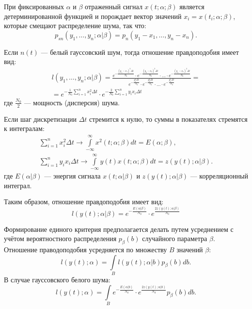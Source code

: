 \documentclass[a4paper,12pt]{article}
\begin{document}
    При фиксированных $\alpha$ и $\beta$ отраженный сигнал $x(t; \alpha; \beta)$ является детерминированной функцией и порождает вектор значений
    $x_i = x(t_i; \alpha; \beta)$, которые смещают распределение шума, так что:
    \[
        p_{sn}(y_1, \dots, y_n; \alpha | \beta) = p_n ( y_1 - x_1, \dots, y_n - x_n ) .
    \]

    Если $n(t)$ --- белый гауссовский шум, тогда отношение правдоподобия имеет вид:
    \begin{multline*}
        l(y_1, \dots, y_n; \alpha | \beta)
        = \frac
        {
            e^{-\frac{(y_1 - x_1)^2 \Delta t}{N_0}} \cdot e^{-\frac{(y_2 - x_2)^2 \Delta t}{N_0}} \cdot ... \cdot e^{-\frac{(y_n - x_n)^2 \Delta t}{N_0}}
        }
        {
            e^{-\frac{y_1^2 \Delta t}{N_0}} \cdot e^{-\frac{y_2^2 \Delta t}{N_0}} \cdot ... \cdot e^{-\frac{y_n^2 \Delta t}{N_0}}
        }
        = \\
        = e^{-\frac{1}{N_0} \sum_{i=1}^n x_i^2 \Delta t} \cdot e^{-\frac{2}{N_0} \sum_{i=1}^n y_i x_i \Delta t}
    \end{multline*}
    где $\frac{N_0}{2}$ --- мощность (дисперсия) шума.

    Если шаг дискретизации $\Delta t$ стремится к нулю, то суммы в показателях стремятся к интегралам:
    \begin{gather*}
        \sum_{i=1}^n x_i^2 \Delta t \rightarrow \int \limits_{-\infty}^{\infty} x^2(t; \alpha; \beta) dt = E(\alpha; \beta) , \\
        \sum_{i=1}^n y_i x_i \Delta t \rightarrow \int \limits_{-\infty}^{\infty} y(t) x(t; \alpha; \beta) dt = z(y(t); \alpha | \beta) .
    \end{gather*}
    где $E(\alpha | \beta)$ --- энергия сигнала $x(t; \alpha | \beta)$ и $z(y(t); \alpha | \beta)$ --- корреляционный интеграл.

    Таким образом, отношение правдоподобия имеет вид:
    \[
        l(y(t); \alpha | \beta) = e^{-\frac{E(\alpha | \beta)}{N_0}} \cdot e^{\frac{2 z(y(t); \alpha | \beta)}{N_0}}
    \]

    Формирование единого критерия предполагается делать путем усреднением с учётом вероятностного распределения $p_\beta(b)$ случайного параметра $\beta$.
    Отношение праводоподобия усредняется по множеству $B$ значений $\beta$:
    \[
        l(y(t); \alpha) = \int \limits_B l(y(t); \alpha | b) p_\beta(b) d b .
    \]
    В случае гауссовского белого шума:
    \[
        l(y(t); \alpha) = \int \limits_B e^{-\frac{E(\alpha | b)}{N_0}} \cdot e^{\frac{2 z(y(t); \alpha | b)}{N_0}} p_\beta(b) d b .
    \]
\end{document}
